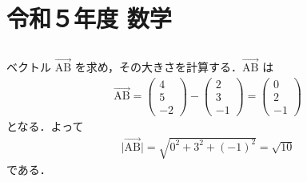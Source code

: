 \section{令和５年度 数学}

\subsection{}

\subsubsection{}
ベクトル $\overrightarrow{\mathrm{AB}}$ を求め，その大きさを計算する．$\overrightarrow{\mathrm{AB}}$ は
\begin{align*}
  \overrightarrow{\mathrm{AB}} = \begin{pmatrix}4 \\ 5 \\ -2 \end{pmatrix} - \begin{pmatrix}2 \\ 3 \\ -1 \end{pmatrix} = \begin{pmatrix}0 \\ 2 \\ -1 \end{pmatrix}
\end{align*}
となる．よって
\begin{align*}
  \lvert\overrightarrow{\mathrm{AB}}\lvert = \sqrt{0^2 + 3^2 + (-1)^2} = \sqrt{10}
\end{align*}
である．


\subsubsection{}
\subsubsection{}
\subsubsection{}

\subsection{}

\subsection{}